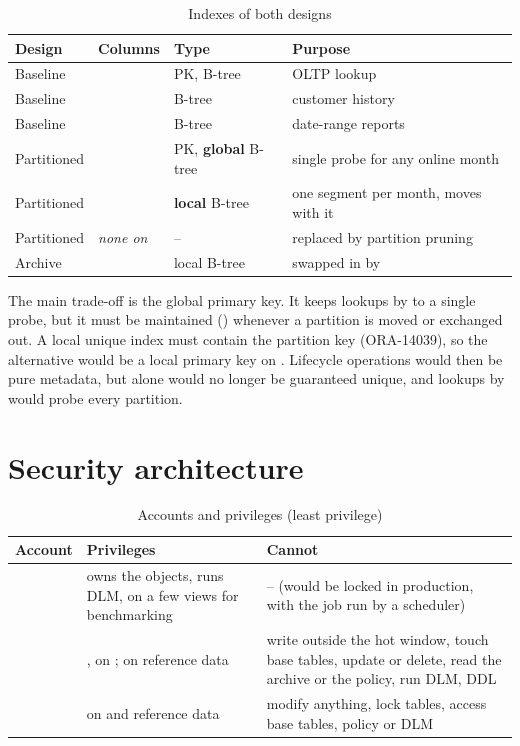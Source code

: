 \begin{table}[H]
\centering
\caption{Indexes of both designs}
\begin{tabularx}{\linewidth}{lllL}
\toprule
Design & Columns & Type & Purpose \\
\midrule
Baseline &  & PK, B-tree & OLTP lookup \\
Baseline &  & B-tree & customer history \\
Baseline &  & B-tree & date-range reports \\
Partitioned &  & PK, \textbf{global} B-tree & single probe for any online month \\
Partitioned &  & \textbf{local} B-tree & one segment per month, moves with it \\
Partitioned & \emph{none on}  & -- & replaced by partition pruning \\
Archive &  & local B-tree & swapped in by  \\
\bottomrule
\end{tabularx}
\end{table}

The main trade-off is the global primary key. It keeps lookups by  to a single
probe, but it must be maintained () whenever a partition is moved
or exchanged out. A local unique index must contain the partition key (ORA-14039), so the
alternative would be a local primary key on . Lifecycle
operations would then be pure metadata, but  alone would no longer be
guaranteed unique, and lookups by  would probe every partition.

\section{Security architecture}

\begin{table}[H]
\centering
\caption{Accounts and privileges (least privilege)}
\begin{tabularx}{\linewidth}{lLL}
\toprule
Account & Privileges & Cannot \\
\midrule
{} & owns the objects, runs DLM,  on a few  views for benchmarking & -- (would be locked in production, with the job run by a scheduler) \\
 & ,  on ;  on reference data & write outside the hot window, touch base tables, update or delete, read the archive or the policy, run DLM, DDL \\
 &  on  and reference data & modify anything, lock tables, access base tables, policy or DLM \\
\bottomrule
\end{tabularx}
\end{table}

